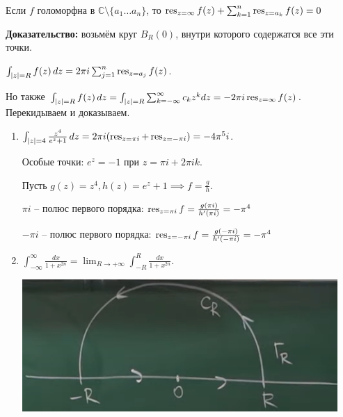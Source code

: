 \begin{consequence}
    Если $f$ голоморфна в $\mathbb{C} \setminus \{ a_1 \ldots a_n \} $, то
    $\operatorname{res}_{z = \infty} f(z) + \sum_{k = 1}^n \operatorname{res}_{z = a_k} f(z) = 0$

    \textbf{Доказательство:} возьмём круг $B_R (0)$, внутри которого содержатся все эти точки.

    $\int_{|z| = R} f(z) \, dz = 2 \pi i \sum_{j = 1}^n \operatorname{res}_{z = a_j} f(z)$.

    Но также $\int_{|z| = R} f(z) \, dz = \int_{|z| = R}{ \sum_{k = -\infty}^{\infty} c_k z^k dz } = -2 \pi i \operatorname{res}_{z = \infty} f(z)$. Перекидываем и доказываем.
\end{consequence}

\begin{example}
    \begin{enumerate}
        \item {
            $\int_{|z| = 4} \frac{z^4}{e^z + 1} \, dz = 2 \pi i (\operatorname{res}_{z = \pi i} + \operatorname{res}_{z = -\pi i}) = -4\pi^5 i$.

            Особые точки: $e^z = -1$ при $z = \pi i + 2 \pi i k$.

            Пусть $g(z) = z^4, h(z) = e^z + 1 \implies f = \frac{g}{h}$.

            $\pi i$ -- полюс первого порядка: $\operatorname{res}_{z = \pi i} f = \frac{g(\pi i)}{h'(\pi i)} = -\pi^4$

            $-\pi i$ -- полюс первого порядка: $\operatorname{res}_{z = -\pi i} f = \frac{g(-\pi i)}{h'(-\pi i)} = -\pi^4$
        }
        \item {
            $\int_{-\infty}^{\infty} \frac{dx}{1 + x^{2n}} = \lim_{R \to +\infty} \int_{-R}^{R} \frac{dx}{1 + x^{2n}}$.

            \begin{center}
                \includegraphics[width=12cm]{assets/04-functions-of-complex-variables/example-2-cauchy-about-deductions.png}
            \end{center}

}
\end{enumerate}
\end{example}
